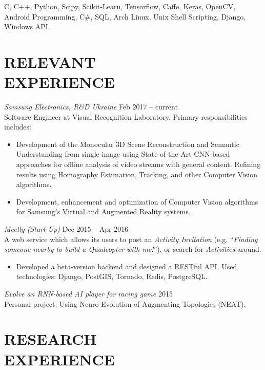 \documentclass[margin, 10pt]{res} %
\begin{document}
\begin{resume}
C, C++, Python, Scipy, Scikit-Learn, Tensorflow, Caffe, Keras, OpenCV, Android Programming, C\#, SQL, Arch Linux, Unix Shell Scripting, Django, Windows API.
 
\section{RELEVANT\\EXPERIENCE}

{{\sl Samsung Electronics, R\&D Ukraine} \hfill Feb 2017 -- current}\\
Software Engineer at Visual Recognition Laboratory. Primary responsibilities includes:

\begin{itemize} \itemsep -2pt %
\item Development of the Monocular 3D Scene Reconstruction and Semantic Understanding from single image using State-of-the-Art CNN-based approaches for offline analysis of video streams with general content. Refining results using Homography Estimation, Tracking, and other Computer Vision algorithms.
\item Development, enhancement and optimization of Computer Vision algorithms for Samsung's Virtual and Augmented Reality systems.
\end{itemize}
\vspace*{-1.6\baselineskip}\leavevmode

{{\sl Meetly (Start-Up)} \hfill Dec 2015 -- Apr 2016}\\
A web service which allows its users to post an {\sl Activity Invitation} (e.g. \enquote{\sl Finding someone nearby to build a Quadcopter with me!}), or search for {\sl Activities} around.
\begin{itemize} \itemsep -2pt %
\item Developed a beta-version backend and designed a RESTful API. Used technologies: Django, PostGIS, Tornado, Redis, PostgreSQL.
\end{itemize}
\vspace*{-1.6\baselineskip}\leavevmode

{{\sl Evolve an RNN-based AI player for racing game} \hfill 2015} \\
Personal project. Using Neuro-Evolution of Augmenting Topologies (NEAT).
 
\section{RESEARCH\\EXPERIENCE}


\end{resume}
\end{document}
